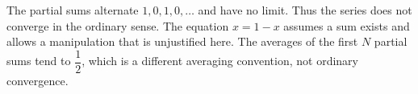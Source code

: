 The partial sums alternate $1,0,1,0,\ldots$ and have no limit. Thus the series does not converge in the ordinary sense. The equation $x=1-x$ assumes a sum exists and allows a manipulation that is unjustified here. The averages of the first $N$ partial sums tend to $\dfrac{1}{2}$, which is a different averaging convention, not ordinary convergence.
